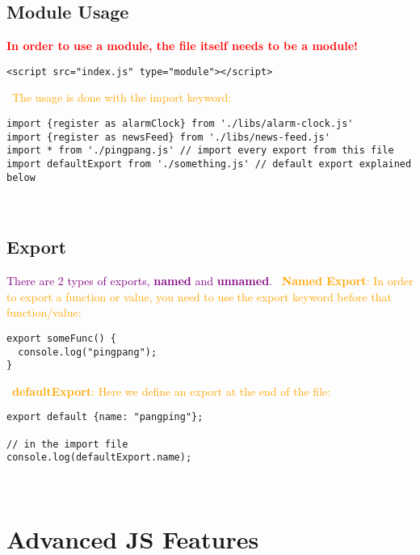 \documentclass[main.tex,fontsize=6pt,paper=a4,paper=landscape,DIV=calc,]{scrartcl}
\begin{document}
\begin{multicols*}{4}
\subsection{Module Usage}  
\textcolor{red}{\textbf{In order to use a module, the file itself needs to be a module!}}\newline
\begin{lstlisting}
<script src="index.js" type="module"></script>
\end{lstlisting}
\, \newline
\textcolor{orange}{The usage is done with the import keyword:}\newline
\begin{lstlisting}
import {register as alarmClock} from './libs/alarm-clock.js'
import {register as newsFeed} from './libs/news-feed.js'
import * from './pingpang.js' // import every export from this file 
import defaultExport from './something.js' // default export explained below
\end{lstlisting}
\, \newline

\subsection{Export}
\textcolor{purple}{There are 2 types of exports, \textbf{named} and \textbf{unnamed}.}\newline
\, \newline
\textcolor{orange}{\textbf{Named Export}: In order to export a function or value, you need to use the export keyword before that function/value:}\newline
\begin{lstlisting}
export someFunc() {
  console.log("pingpang");
}
\end{lstlisting}
\, \newline
\textcolor{orange}{\textbf{defaultExport}: Here we define an export at the end of the file:}\newline
\begin{lstlisting}
export default {name: "pangping"};

// in the import file
console.log(defaultExport.name);
\end{lstlisting}
\, \newline



\section{Advanced JS Features}


\end{multicols*}
\end{document}
